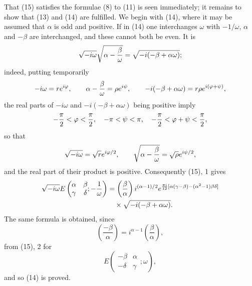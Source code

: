 \documentclass[11pt]{article}
\providecommand{\Jac}[2]{\left(\frac{#1}{#2}\right)}
\begin{document}
That (15) satisfies the formulae (8) to (11) is seen immediately; it remains to show that (13) and (14) are fulfilled. We begin with (14), where it may be assumed that $\alpha$ is odd and positive. If in (14) one interchanges $\omega$ with $-1/\omega$, $\alpha$ and $-\beta$ are interchanged, and these cannot both be even. It is
\[
\sqrt{-i\omega}\sqrt{\alpha-{\beta\over\omega}}=
\sqrt{-i(-\beta+\alpha\omega)};
\]
indeed, putting temporarily
\[
-i\omega=re^{i\varphi},
\qquad
\alpha-{\beta\over\omega}=\rho e^{i\psi},
\qquad
-i(-\beta+\alpha\omega)=r\rho e^{i(\varphi+\psi)},
\]
the real parts of $-i\omega$ and $-i(-\beta+\alpha\omega)$ being positive imply
\[
-{\pi\over2}<\varphi<{\pi\over2},
\quad -\pi<\psi<\pi,
\quad -{\pi\over2}<\varphi+\psi<{\pi\over2},
\]
so that
\[
\sqrt{-i\omega}=\sqrt r e^{i\varphi/2},
\qquad
\sqrt{\alpha-{\beta\over\omega}}=\sqrt\rho e^{i\psi/2},
\]
and the real part of their product is positive. Consequently (15), 1 gives
\begin{align*}
\sqrt{-i\omega}
E\left(\begin{matrix}\alpha&\beta\\ \gamma&\delta\end{matrix};-{1\over\omega}\right)
&=\Jac{\beta}{\alpha} i^{(\alpha-1)/2}
 e^{{\pi i\over12}[\alpha(\gamma-\beta)-(\alpha^2-1)\beta\delta]}\\
&\quad\times\sqrt{-i(-\beta+\alpha\omega)}.
\end{align*}
The same formula is obtained, since
\[
\Jac{-\beta}{\alpha}=i^{\alpha-1}\Jac{\beta}{\alpha},
\]
from (15), 2 for
\[
E\left(\begin{matrix}-\beta&\alpha\\ -\delta&\gamma\end{matrix};\omega\right),
\]
and so (14) is proved.
\end{document}
